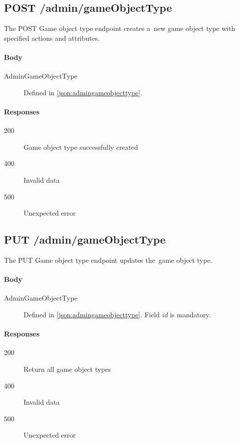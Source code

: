 	\subsection{POST /admin/gameObjectType}
	The POST Game object type endpoint creates a~new game object type with specified actions and attributes. 
		\paragraph*{Body}
			\begin{description}
				\item[AdminGameObjectType] Defined in \ref{json:admingameobjecttype}.
			\end{description}
		\paragraph*{Responses}
			\begin{description}		
				\item[200] Game object type successfully created
				\item[400] Invalid data
				\item[500] Unexpected error
			\end{description}
			
	\subsection{PUT /admin/gameObjectType}
	The PUT Game object type endpoint updates the~game object type.
		\paragraph*{Body}
			\begin{description}
				\item[AdminGameObjectType] Defined in \ref{json:admingameobjecttype}. Field \textit{id} is mandatory.
			\end{description}
		\paragraph*{Responses}
			\begin{description}		
				\item[200] Return all game object types
				\item[400] Invalid data
				\item[500] Unexpected error
			\end{description}			
				

